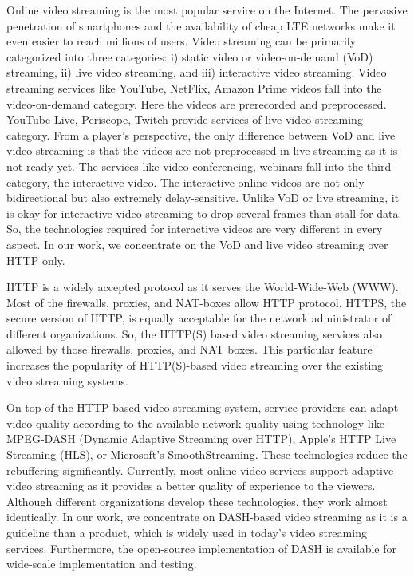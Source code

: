 Online video streaming is the most popular service on the Internet. The pervasive penetration of smartphones and the availability of cheap LTE networks make it even easier to reach millions of users. Video streaming can be primarily categorized into three categories: i) static video or video-on-demand (VoD) streaming, ii) live video streaming, and iii) interactive video streaming. Video streaming services like YouTube, NetFlix, Amazon Prime videos fall into the video-on-demand category. Here the videos are prerecorded and preprocessed. YouTube-Live, Periscope, Twitch provide services of live video streaming category. From a player's perspective, the only difference between VoD and live video streaming is that the videos are not preprocessed in live streaming as it is not ready yet. The services like video conferencing, webinars fall into the third category, the interactive video. The interactive online videos are not only bidirectional but also extremely delay-sensitive. Unlike VoD or live streaming, it is okay for interactive video streaming to drop several frames than stall for data. So, the technologies required for interactive videos are very different in every aspect. In our work, we concentrate on the VoD and live video streaming over HTTP only.

HTTP is a widely accepted protocol as it serves the World-Wide-Web (WWW). Most of the firewalls, proxies, and NAT-boxes allow HTTP protocol. HTTPS, the secure version of HTTP, is equally acceptable for the network administrator of different organizations. So, the HTTP(S) based video streaming services also allowed by those firewalls, proxies, and NAT boxes. This particular feature increases the popularity of HTTP(S)-based video streaming over the existing video streaming systems.

On top of the HTTP-based video streaming system, service providers can adapt video quality according to the available network quality using technology like MPEG-DASH (Dynamic Adaptive Streaming over HTTP), Apple's HTTP Live Streaming (HLS), or Microsoft's SmoothStreaming. These technologies reduce the rebuffering significantly. Currently, most online video services support adaptive video streaming as it provides a better quality of experience to the viewers. Although different organizations develop these technologies, they work almost identically. In our work, we concentrate on DASH-based video streaming as it is a guideline than a product, which is widely used in today's video streaming services. Furthermore, the open-source implementation of DASH is available for wide-scale implementation and testing.

